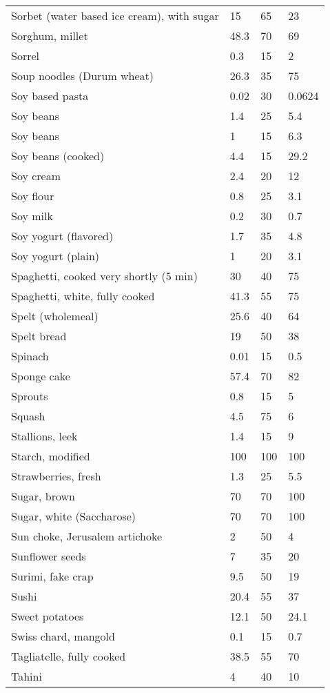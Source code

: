 \documentclass[../main.tex]{subfiles}
\begin{document}
\begin{longtable}{llll}
Sorbet (water based ice cream), with sugar & 15 & 65 & 23 \\
Sorghum, millet & 48.3 & 70 & 69 \\
Sorrel & 0.3 & 15 & 2 \\
Soup noodles (Durum wheat) & 26.3 & 35 & 75 \\
Soy based pasta & 0.02 & 30 & 0.0624 \\
Soy beans & 1.4 & 25 & 5.4 \\
Soy beans & 1 & 15 & 6.3 \\
Soy beans (cooked) & 4.4 & 15 & 29.2 \\
Soy cream & 2.4 & 20 & 12 \\
Soy flour & 0.8 & 25 & 3.1 \\
Soy milk & 0.2 & 30 & 0.7 \\
Soy yogurt (flavored) & 1.7 & 35 & 4.8 \\
Soy yogurt (plain) & 1 & 20 & 3.1 \\
Spaghetti, cooked very shortly (5 min) & 30 & 40 & 75 \\
Spaghetti, white, fully cooked  & 41.3 & 55 & 75 \\
Spelt (wholemeal) & 25.6 & 40 & 64 \\
Spelt bread & 19 & 50 & 38 \\
Spinach & 0.01 & 15 & 0.5 \\
Sponge cake & 57.4 & 70 & 82 \\
Sprouts & 0.8 & 15 & 5 \\
Squash & 4.5 & 75 & 6 \\
Stallions, leek & 1.4 & 15 & 9 \\
Starch, modified & 100 & 100 & 100 \\
Strawberries, fresh & 1.3 & 25 & 5.5 \\
Sugar, brown & 70 & 70 & 100 \\
Sugar, white (Saccharose) & 70 & 70 & 100 \\
Sun choke, Jerusalem artichoke & 2 & 50 & 4 \\
Sunflower seeds & 7 & 35 & 20 \\
Surimi, fake crap & 9.5 & 50 & 19 \\
Sushi & 20.4 & 55 & 37 \\
Sweet potatoes & 12.1 & 50 & 24.1 \\
Swiss chard, mangold & 0.1 & 15 & 0.7 \\
Tagliatelle, fully cooked & 38.5 & 55 & 70 \\
Tahini & 4 & 40 & 10 \\

\end{longtable}
\end{document}

